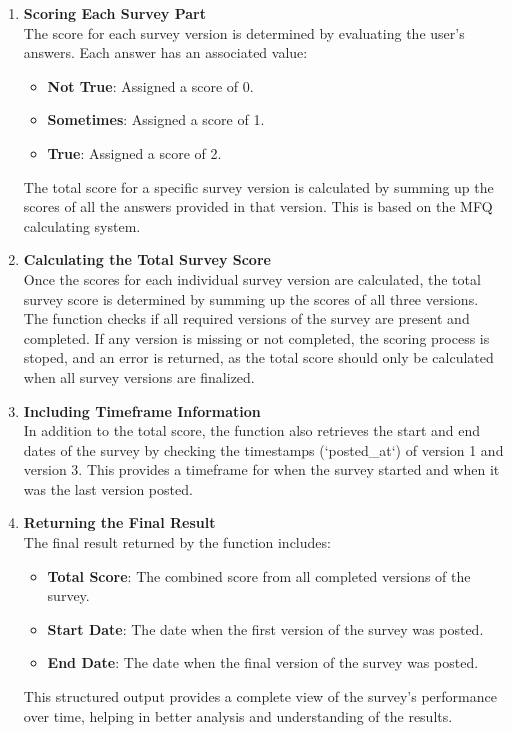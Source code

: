 \begin{enumerate}
    \item \textbf{Scoring Each Survey Part} \\
    The score for each survey version is determined by evaluating the user's answers. Each answer has an associated value:
    \begin{itemize}
        \item \textbf{Not True}: Assigned a score of 0.
        \item \textbf{Sometimes}: Assigned a score of 1.
        \item \textbf{True}: Assigned a score of 2.
    \end{itemize}
    The total score for a specific survey version is calculated by summing up the scores of all the answers provided in that version. This is based on the MFQ calculating system.

    \item \textbf{Calculating the Total Survey Score} \\
    Once the scores for each individual survey version are calculated, the total survey score is determined by summing up the scores of all three versions. The function checks if all required versions of the survey are present and completed. If any version is missing or not completed, the scoring process is stoped, and an error is returned, as the total score should only be calculated when all survey versions are finalized.

    \item \textbf{Including Timeframe Information} \\
    In addition to the total score, the function also retrieves the start and end dates of the survey by checking the timestamps (`posted\_at`) of version 1 and version 3. This provides a timeframe for when the survey started and when it was the last version posted.

    \item \textbf{Returning the Final Result} \\
    The final result returned by the function includes:
    \begin{itemize}
        \item \textbf{Total Score}: The combined score from all completed versions of the survey.
        \item \textbf{Start Date}: The date when the first version of the survey was posted.
        \item \textbf{End Date}: The date when the final version of the survey was posted.
    \end{itemize}
    This structured output provides a complete view of the survey's performance over time, helping in better analysis and understanding of the results.
\end{enumerate}

